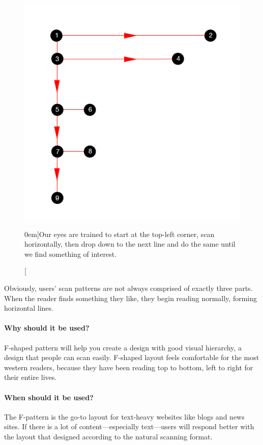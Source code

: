 \begin{figure}%
	\centering
  \includegraphics[width=1\textwidth]{../figures/f-pattern.png}
  \caption[][0em]{Our eyes are trained to start at the top-left corner, scan horizontally, then drop down to the next line and do the same until we find something of interest.}
  \label{fig:f-layout}
\end{figure}

Obviously, users’ scan patterns are not always comprised of exactly three parts. When the reader finds something they like, they begin reading normally, forming horizontal lines.

\paragraph{Why should it be used?}
F-shaped pattern will help you create a design with good visual hierarchy, a design that people can scan easily. F-shaped layout feels comfortable for the most western readers, because they have been reading top to bottom, left to right for their entire lives.

\paragraph{When should it be used?}
The F-pattern is the go-to layout for text-heavy websites like blogs and news sites. If there is a lot of content---especially text---users will respond better with the layout that designed according to the natural scanning format.



